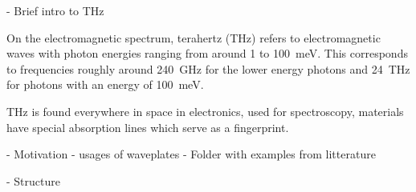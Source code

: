 - Brief intro to THz

On the electromagnetic spectrum, terahertz (THz) refers to electromagnetic waves with photon energies ranging from around 1 to \SI{100}{\milli \electronvolt}. This corresponds to frequencies roughly around \SI{240}{\giga \hertz} for the lower energy photons and \SI{24}{\tera \hertz} for photons with an energy of \SI{100}{\milli \electronvolt}.


THz is found everywhere in space in electronics, used for spectroscopy, materials have special absorption lines which serve as a fingerprint.

- Motivation
    - usages of waveplates
    - Folder with examples from litterature

- Structure